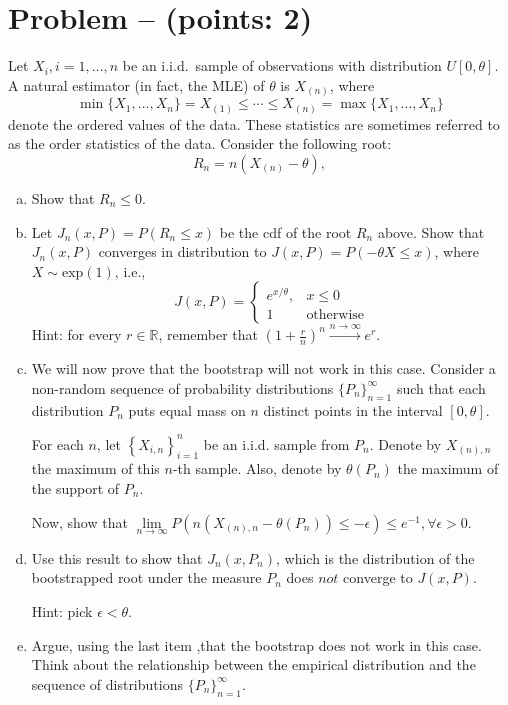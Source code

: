 \documentclass[11pt]{article}
\theoremstyle{definition}
\newcounter{problem}
\renewcommand{\theproblem}{\arabic{problem}}
\newcommand{\problem}[1]{
	\stepcounter{problem}
	\section*{Problem \theproblem{} -- (points: #1)}
}
\begin{document}
\problem{2}
Let $X_i, i = 1, \dots, n$ be an i.i.d.\ sample of observations with distribution $U[0, \theta]$. A natural estimator (in fact, the MLE) of $\theta$ is $X_{(n)}$, where
\[
\min\{X_1, ..., X_n\} =  X_{(1)} \leq \cdots \leq X_{(n)} = \max\{X_1, ..., X_n\}
\]
denote the ordered values of the data. These statistics are sometimes referred to as the order statistics of the data. Consider the following root:
\[
R_n = n(X_{(n)} - \theta),
\]

\begin{enumerate}[a)]
	\item Show that $R_n \leq 0$.
    \item Let $J_n(x, P) = P(R_n \leq x)$ be the cdf of the root $R_n$ above. Show that $J_n(x, P)$ converges in distribution to $J(x, P) = P(-\theta X \leq x)$, where $X \sim \text{exp}(1)$, i.e.,
    \[
    J(x, P) =
    \begin{cases}
    e^{x/\theta}, & x \leq 0 \\
    1 & \text{otherwise}
    \end{cases}
    \]
	Hint: for every $r \in \mathbb{R}$, remember that $\left(1 + \frac{r}{n}\right)^{n} \xrightarrow{n \to \infty} e^r$.

	\item We will now prove that the bootstrap will not work in this case. Consider a non-random sequence of probability distributions $\{P_n\}_{n=1}^{\infty}$ such that each distribution $P_n$ puts equal mass on $n$ distinct points in the interval $[0, \theta]$.
	
	For each $n$, let $\left\{X_{i, n}\right\}_{i=1}^{n}$ be an i.i.d. sample from $P_n$. Denote by $X_{(n), n}$ the maximum of this $n$-th sample. Also, denote by $\theta(P_n)$ the maximum of the support of $P_n$.
	
	Now, show that $\lim\limits_{n\rightarrow \infty}P\left(n (X_{(n), n} - \theta(P_n)) \leq - \epsilon\right) \leq e^{-1}, \forall \epsilon >0$.

	\item Use this result to show that $J_n(x, P_n)$, which is the distribution of the bootstrapped root under the measure $P_n$ does $not$ converge to $J(x, P)$.
	
	Hint: pick $\epsilon < \theta$.

	\item Argue, using the last item ,that the bootstrap does not work in this case. Think about the relationship between the empirical distribution and the sequence of distributions $\{P_n\}_{n=1}^{\infty}$.
\end{enumerate}
\end{document}
